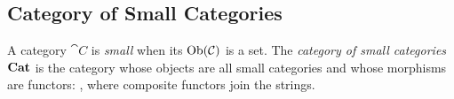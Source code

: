 
\subsection{Category of Small Categories}

A category $\cat{C}$ is \textit{small} when its $\operatorname{Ob}(\mathcal{C})$ is a set. %
The \textit{category of small categories} $\boldsymbol{\mathrm{Cat}}$ is the category whose objects are %
all small categories and whose morphisms are functors:
, where composite functors join the strings.


